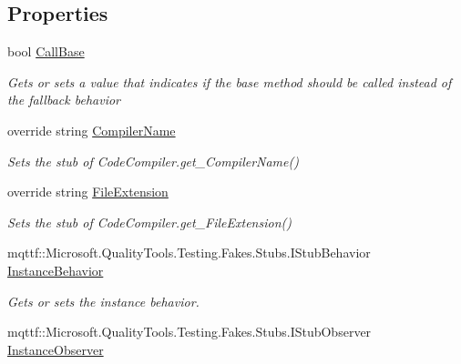 \subsection*{Properties}
\begin{DoxyCompactItemize}
\item 
bool \hyperlink{class_system_1_1_code_dom_1_1_compiler_1_1_fakes_1_1_stub_code_compiler_af8b8970f627fc578ce51a7b587e54176}{Call\-Base}
\begin{DoxyCompactList}\small\item\em Gets or sets a value that indicates if the base method should be called instead of the fallback behavior\end{DoxyCompactList}\item 
override string \hyperlink{class_system_1_1_code_dom_1_1_compiler_1_1_fakes_1_1_stub_code_compiler_aabd87702d303c27a76815f48d933be92}{Compiler\-Name}
\begin{DoxyCompactList}\small\item\em Sets the stub of Code\-Compiler.\-get\-\_\-\-Compiler\-Name()\end{DoxyCompactList}\item 
override string \hyperlink{class_system_1_1_code_dom_1_1_compiler_1_1_fakes_1_1_stub_code_compiler_af3dfddd54b0facade99e1e658f3681c1}{File\-Extension}
\begin{DoxyCompactList}\small\item\em Sets the stub of Code\-Compiler.\-get\-\_\-\-File\-Extension()\end{DoxyCompactList}\item 
mqttf\-::\-Microsoft.\-Quality\-Tools.\-Testing.\-Fakes.\-Stubs.\-I\-Stub\-Behavior \hyperlink{class_system_1_1_code_dom_1_1_compiler_1_1_fakes_1_1_stub_code_compiler_afc4f25f9923ad9decf9b461e85ad239a}{Instance\-Behavior}
\begin{DoxyCompactList}\small\item\em Gets or sets the instance behavior.\end{DoxyCompactList}\item 
mqttf\-::\-Microsoft.\-Quality\-Tools.\-Testing.\-Fakes.\-Stubs.\-I\-Stub\-Observer \hyperlink{class_system_1_1_code_dom_1_1_compiler_1_1_fakes_1_1_stub_code_compiler_a34e1a6cbdea425ed5d6ef98bcecc5088}{Instance\-Observer}

\end{DoxyCompactItemize}
